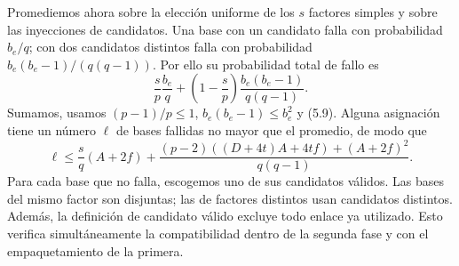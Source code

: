 \documentclass[spanish,11pt,a4paper]{article}
\begin{document}
Promediemos ahora sobre la elección uniforme de los \(s\) factores simples y sobre las inyecciones de candidatos. Una base con un candidato falla con probabilidad \(b_e/q\); con dos candidatos distintos falla con probabilidad \(b_e(b_e-1)/(q(q-1))\). Por ello su probabilidad total de fallo es \[
\frac{s}{p}\frac{b_e}{q}
+\left(1-\frac{s}{p}\right)\frac{b_e(b_e-1)}{q(q-1)}.
\tag{5.10}
\] Sumamos, usamos \((p-1)/p\le1\), \(b_e(b_e-1)\le b_e^2\) y (5.9). Alguna asignación tiene un número \(\ell\) de bases fallidas no mayor que el promedio, de modo que \[
\ell\le\frac{s}{q}(A+2f)
+\frac{(p-2)((D+4t)A+4tf)+(A+2f)^2}{q(q-1)}.
\tag{5.11}
\] Para cada base que no falla, escogemos uno de sus candidatos válidos. Las bases del mismo factor son disjuntas; las de factores distintos usan candidatos distintos. Además, la definición de candidato válido excluye todo enlace ya utilizado. Esto verifica simultáneamente la compatibilidad dentro de la segunda fase y con el empaquetamiento de la primera.
\end{document}
